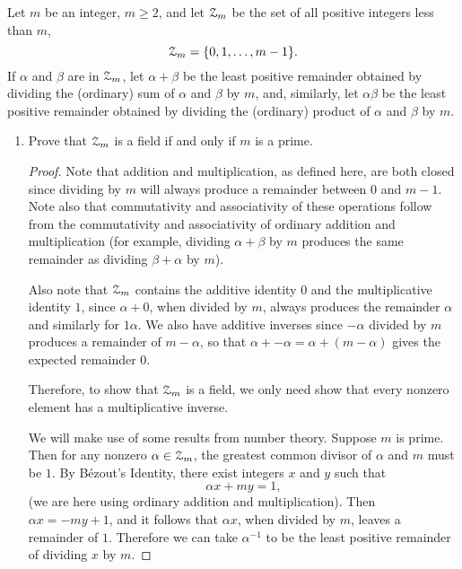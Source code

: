  Let $m$ be an integer, $m\geq2$, and let $\mathcal{Z}_m$ be the set
of all positive integers less than $m$,
\begin{equation*}
  \mathcal{Z}_m = \{0,1,\dots,m-1\}.
\end{equation*}
If $\alpha$ and $\beta$ are in $\mathcal{Z}_m$, let $\alpha + \beta$ be the
least positive remainder obtained by dividing the (ordinary) sum of
$\alpha$ and $\beta$ by $m$, and, similarly, let $\alpha\beta$ be the
least positive remainder obtained by dividing the (ordinary) product
of $\alpha$ and $\beta$ by $m$.
\begin{enumerate}
\item Prove that $\mathcal{Z}_m$ is a field if and only if $m$ is a prime.
  \begin{proof}
    Note that addition and multiplication, as defined here, are both
    closed since dividing by $m$ will always produce a remainder
    between $0$ and $m - 1$. Note also that commutativity and
    associativity of these operations follow from the commutativity
    and associativity of ordinary addition and multiplication (for
    example, dividing $\alpha + \beta$ by $m$ produces the same
    remainder as dividing $\beta + \alpha$ by $m$).

    Also note that $\mathcal{Z}_m$ contains the additive identity $0$ and the
    multiplicative identity $1$, since $\alpha + 0$, when divided by
    $m$, always produces the remainder $\alpha$ and similarly for
    $1\alpha$. We also have additive inverses since $-\alpha$ divided
    by $m$ produces a remainder of $m - \alpha$, so that
    $\alpha + -\alpha = \alpha + (m - \alpha)$ gives the expected
    remainder $0$.

    Therefore, to show that $\mathcal{Z}_m$ is a field, we only need show that
    every nonzero element has a multiplicative inverse.

    We will make use of some results from number theory. Suppose $m$
    is prime. Then for any nonzero $\alpha\in\mathcal{Z}_m$, the greatest
    common divisor of $\alpha$ and $m$ must be $1$. By B\'ezout's
    Identity, there exist integers $x$ and $y$ such that
    \begin{equation*}
      \alpha x + my = 1,
    \end{equation*}
    (we are here using ordinary addition and multiplication). Then
    $\alpha x = -my + 1$, and it follows that $\alpha x$, when divided
    by $m$, leaves a remainder of $1$. Therefore we can take
    $\alpha^{-1}$ to be the least positive remainder of dividing $x$
    by $m$.


\end{proof}
\end{enumerate}
